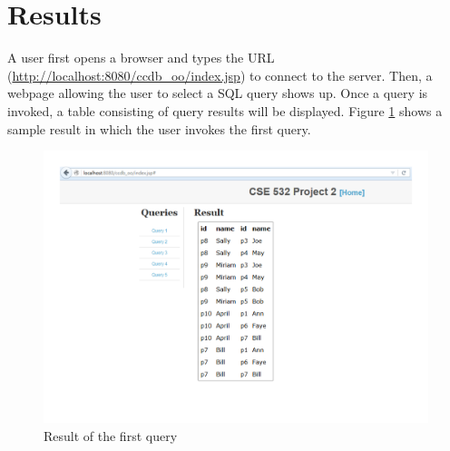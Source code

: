 \documentclass[11pt]{article}
\begin{document}
\section{Results}
A user first opens a browser and types the URL (\url{http://localhost:8080/ccdb_oo/index.jsp}) to connect to the server. Then, a webpage allowing the user to select a SQL query shows up. Once a query is invoked, a table consisting of query results will be displayed. Figure \ref{fig:resultccdb} shows a sample result in which the user invokes the first query.

\begin{figure}[!htp]
\centering
\includegraphics[width=7in]{result.pdf}
\caption{Result of the first query}
\label{fig:resultccdb}
\end{figure}
\end{document}
